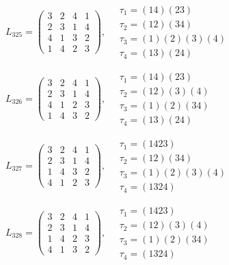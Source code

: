 $L_{325} = \begin{pmatrix} 3 & 2 & 4 & 1 \\ 2 & 3 & 1 & 4 \\ 4 & 1 & 3 & 2 \\ 1 & 4 & 2 & 3 \end{pmatrix}, \quad \begin{matrix} \tau_{1} = (1 4)(2 3) \\ \tau_{2} = (1 2)(3 4) \\ \tau_{3} = (1)(2)(3)(4) \\ \tau_{4} = (1 3)(2 4) \end{matrix}$

$L_{326} = \begin{pmatrix} 3 & 2 & 4 & 1 \\ 2 & 3 & 1 & 4 \\ 4 & 1 & 2 & 3 \\ 1 & 4 & 3 & 2 \end{pmatrix}, \quad \begin{matrix} \tau_{1} = (1 4)(2 3) \\ \tau_{2} = (1 2)(3)(4) \\ \tau_{3} = (1)(2)(3 4) \\ \tau_{4} = (1 3)(2 4) \end{matrix}$

$L_{327} = \begin{pmatrix} 3 & 2 & 4 & 1 \\ 2 & 3 & 1 & 4 \\ 1 & 4 & 3 & 2 \\ 4 & 1 & 2 & 3 \end{pmatrix}, \quad \begin{matrix} \tau_{1} = (1 4 2 3) \\ \tau_{2} = (1 2)(3 4) \\ \tau_{3} = (1)(2)(3)(4) \\ \tau_{4} = (1 3 2 4) \end{matrix}$

$L_{328} = \begin{pmatrix} 3 & 2 & 4 & 1 \\ 2 & 3 & 1 & 4 \\ 1 & 4 & 2 & 3 \\ 4 & 1 & 3 & 2 \end{pmatrix}, \quad \begin{matrix} \tau_{1} = (1 4 2 3) \\ \tau_{2} = (1 2)(3)(4) \\ \tau_{3} = (1)(2)(3 4) \\ \tau_{4} = (1 3 2 4) \end{matrix}$

